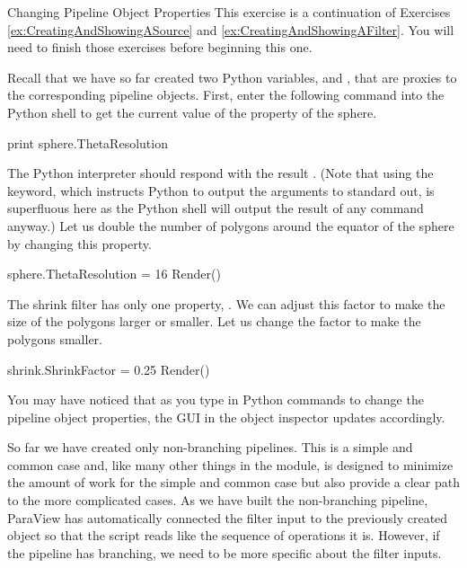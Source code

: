 \begin{exercise}{Changing Pipeline Object Properties}
  \label{ex:ChangingPipelineObjectProperties}%
  This exercise is a continuation of Exercises
  \ref{ex:CreatingAndShowingASource} and
  \ref{ex:CreatingAndShowingAFilter}.  You will need to finish those
  exercises before beginning this one.

  Recall that we have so far created two Python variables, 
  and , that are proxies to the corresponding pipeline
  objects.  First, enter the following command into the Python shell to get
  the current value of the  property of the sphere.

  \begin{python}
print sphere.ThetaResolution
  \end{python}

  The Python interpreter should respond with the result .  (Note
  that using the  keyword, which instructs Python to output
  the arguments to standard out, is superfluous here as the Python shell
  will output the result of any command anyway.)  Let us double the number
  of polygons around the equator of the sphere by changing this property.

  \begin{python}
sphere.ThetaResolution = 16
Render()
  \end{python}

  The shrink filter has only one property, .  We can
  adjust this factor to make the size of the polygons larger or smaller.
  Let us change the factor to make the polygons smaller.

  \begin{python}
shrink.ShrinkFactor = 0.25
Render()
  \end{python}

  You may have noticed that as you type in Python commands to change the
  pipeline object properties, the GUI in the object inspector updates
  accordingly.
\end{exercise}

So far we have created only non-branching pipelines.  This is a simple and
common case and, like many other things in the 
module, is designed to minimize the amount of work for the simple and
common case but also provide a clear path to the more complicated cases.
As we have built the non-branching pipeline, ParaView has automatically
connected the filter input to the previously created object so that the
script reads like the sequence of operations it is.  However, if the
pipeline has branching, we need to be more specific about the filter
inputs.

